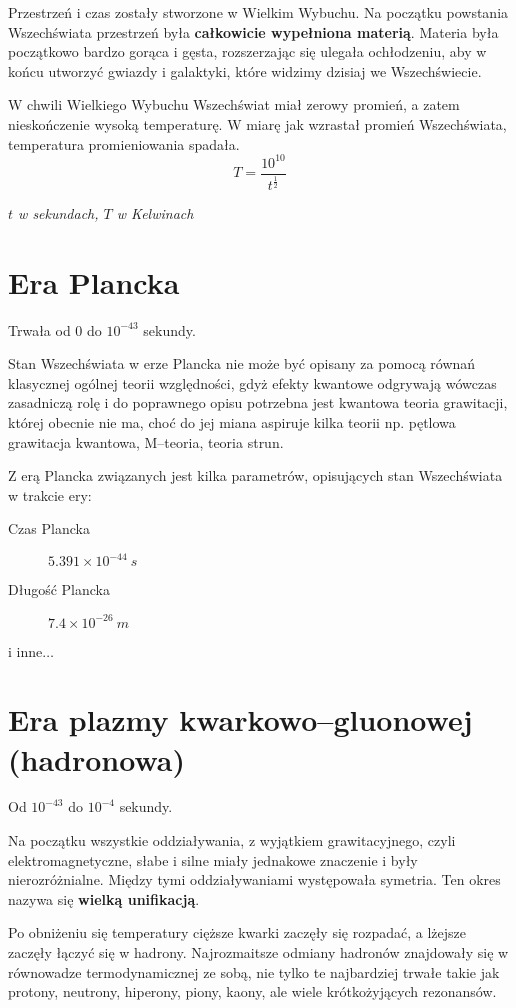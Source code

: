 \documentclass [a4paper, 11pt, oneside]{book}
\begin{document}
	Przestrzeń i czas zostały stworzone w Wielkim Wybuchu. Na początku powstania Wszechświata przestrzeń była \textbf{całkowicie wypełniona materią}. Materia była początkowo bardzo gorąca i gęsta, rozszerzając się ulegała ochłodzeniu, aby w końcu utworzyć gwiazdy i galaktyki, które widzimy dzisiaj we Wszechświecie.

	W chwili Wielkiego Wybuchu Wszechświat miał zerowy promień, a zatem nieskończenie wysoką temperaturę. W miarę jak wzrastał promień Wszechświata, temperatura promieniowania spadała.
	$$T = \frac{10^{10}}{t^{\frac12}}$$
	\begin{flushright}
		\textit{$t$ w sekundach, $T$ w Kelwinach}
	\end{flushright}

	\section{Era Plancka}
	Trwała od 0 do $10^{-43}$ sekundy.

	Stan Wszechświata w erze Plancka nie może być opisany za pomocą równań klasycznej ogólnej teorii względności, gdyż efekty kwantowe odgrywają wówczas zasadniczą rolę i do poprawnego opisu potrzebna jest kwantowa teoria grawitacji, której obecnie nie ma, choć do jej miana aspiruje kilka teorii np. pętlowa grawitacja kwantowa, M--teoria, teoria strun.

	Z erą Plancka związanych jest kilka parametrów, opisujących stan Wszechświata w trakcie ery:
	\begin{description}
		\item[Czas Plancka] $5.391\times 10^{-44}~s$
		\item[Długość Plancka] $7.4\times 10^{-26}~m$
		\item[i inne$\dots$]
	\end{description}

	\section{Era plazmy kwarkowo--gluonowej (hadronowa)}
	Od $10^{-43}$ do $10^{-4}$ sekundy.

	Na początku wszystkie oddziaływania, z wyjątkiem grawitacyjnego, czyli elektromagnetyczne, słabe i silne miały jednakowe znaczenie i były nierozróżnialne. Między tymi oddziaływaniami występowała symetria. Ten okres nazywa się \textbf{wielką unifikacją}.

	Po obniżeniu się temperatury cięższe kwarki zaczęły się rozpadać, a lżejsze zaczęły łączyć się w hadrony. Najrozmaitsze odmiany hadronów znajdowały się w równowadze termodynamicznej ze sobą, nie tylko te najbardziej trwałe takie jak protony, neutrony, hiperony, piony, kaony, ale wiele krótkożyjących rezonansów.
\end{document}
